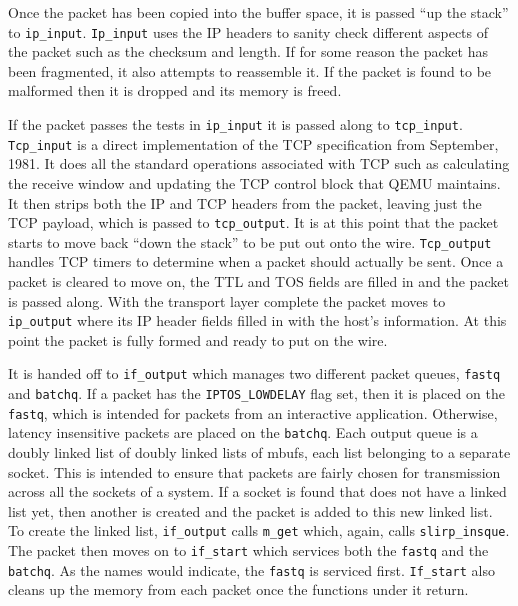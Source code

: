 Once the packet has been copied into the buffer space, it is passed ``up the stack'' to \texttt{ip\_input}. 
\texttt{Ip\_input} uses the IP headers to sanity check different aspects of the packet such as the checksum and length.
If for some reason the packet has been fragmented, it also attempts to reassemble it.
If the packet is found to be malformed then it is dropped and its memory is freed.

If the packet passes the tests in \texttt{ip\_input} it is passed along to \texttt{tcp\_input}.
\texttt{Tcp\_input} is a direct implementation of the TCP specification from September, 1981.
It does all the standard operations associated with TCP such as calculating the receive window and updating the TCP control block that QEMU maintains.
It then strips both the IP and TCP headers from the packet, leaving just the TCP payload, which is passed to \texttt{tcp\_output}.
It is at this point that the packet starts to move back ``down the stack'' to be put out onto the wire.
\texttt{Tcp\_output} handles TCP timers to determine when a packet should actually be sent.
Once a packet is cleared to move on, the TTL and TOS fields are filled in and the packet is passed along.
With the transport layer complete the packet moves to \texttt{ip\_output} where its IP header fields filled in with the host's information.
At this point the packet is fully formed and ready to put on the wire.

It is handed off to \texttt{if\_output} which manages two different packet queues, \texttt{fastq} and \texttt{batchq}.
If a packet has the \texttt{IPTOS\_LOWDELAY} flag set, then it is placed on the \texttt{fastq}, which is intended for packets from an interactive application.
Otherwise, latency insensitive packets are placed on the \texttt{batchq}.
Each output queue is a doubly linked list of doubly linked lists of mbufs, each list belonging to a separate socket.
This is intended to ensure that packets are fairly chosen for transmission across all the sockets of a system.
If a socket is found that does not have a linked list yet, then another is created and the packet is added to this new linked list.
To create the linked list, \texttt{if\_output} calls \texttt{m\_get} which, again, calls \texttt{slirp\_insque}.
The packet then moves on to \texttt{if\_start} which services both the \texttt{fastq} and the \texttt{batchq}.
As the names would indicate, the \texttt{fastq} is serviced first.
\texttt{If\_start} also cleans up the memory from each packet once the functions under it return.

